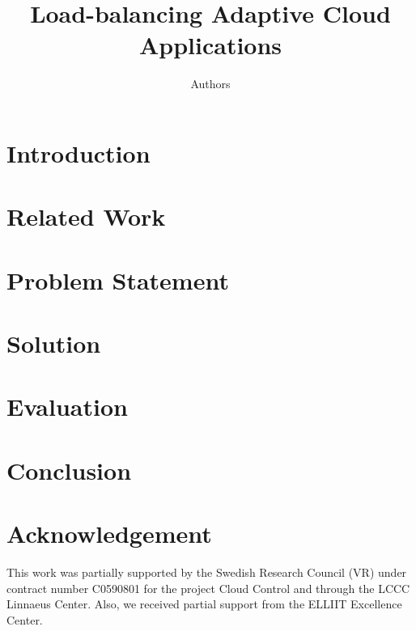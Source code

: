 \documentclass[letterpaper, 10 pt, conference]{ieeeconf}
\title{\LARGE \bf Load-balancing Adaptive Cloud Applications}
\author{Authors}
\begin{document}
\maketitle
\thispagestyle{empty}
\pagestyle{empty}

\begin{abstract}

\end{abstract}

\section{Introduction}
\label{sec:introduction}


\section{Related Work}
\label{sec:related}


\section{Problem Statement}
\label{sec:problem}


\section{Solution}
\label{sec:solution}


\section{Evaluation}
\label{sec:evaluation}


\section{Conclusion}
\label{sec:conclusion}

\section*{Acknowledgement}
  This work was partially supported by the Swedish Research Council
  (VR) under contract number C0590801 for the project Cloud Control
  and through the LCCC Linnaeus Center. Also, we received partial
  support from the ELLIIT Excellence Center.

\printbibliography
\end{document}
